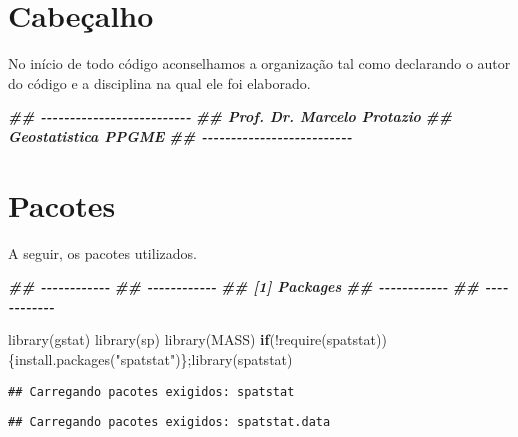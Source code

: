 \documentclass[
]{book}
\newenvironment{Shaded}{\begin{snugshade}}{\end{snugshade}}
\newcommand{\ControlFlowTok}[1]{\textcolor[rgb]{0.13,0.29,0.53}{\textbf{#1}}}
\newcommand{\DocumentationTok}[1]{\textcolor[rgb]{0.56,0.35,0.01}{\textbf{\textit{#1}}}}
\newcommand{\FunctionTok}[1]{\textcolor[rgb]{0.00,0.00,0.00}{#1}}
\newcommand{\NormalTok}[1]{#1}
\newcommand{\SpecialCharTok}[1]{\textcolor[rgb]{0.00,0.00,0.00}{#1}}
\newcommand{\StringTok}[1]{\textcolor[rgb]{0.31,0.60,0.02}{#1}}
\theoremstyle{definition}
\theoremstyle{definition}
\theoremstyle{definition}
\theoremstyle{definition}
\theoremstyle{remark}
\begin{document}
\hypertarget{cabeuxe7alho}{%
\section{Cabeçalho}\label{cabeuxe7alho}}

No início de todo código aconselhamos a organização tal como declarando o autor do código e a disciplina na qual ele foi elaborado.

\begin{Shaded}
\begin{Highlighting}[]
\DocumentationTok{\#\# {-}{-}{-}{-}{-}{-}{-}{-}{-}{-}{-}{-}{-}{-}{-}{-}{-}{-}{-}{-}{-}{-}{-}{-}{-}{-}}
\DocumentationTok{\#\# Prof. Dr. Marcelo Protazio}
\DocumentationTok{\#\# Geostatistica PPGME}
\DocumentationTok{\#\# {-}{-}{-}{-}{-}{-}{-}{-}{-}{-}{-}{-}{-}{-}{-}{-}{-}{-}{-}{-}{-}{-}{-}{-}{-}{-}}
\end{Highlighting}
\end{Shaded}

\hypertarget{pacotes}{%
\section{Pacotes}\label{pacotes}}

A seguir, os pacotes utilizados.

\begin{Shaded}
\begin{Highlighting}[]
\DocumentationTok{\#\# {-}{-}{-}{-}{-}{-}{-}{-}{-}{-}{-}{-}}
\DocumentationTok{\#\# {-}{-}{-}{-}{-}{-}{-}{-}{-}{-}{-}{-}}
\DocumentationTok{\#\# [1] Packages}
\DocumentationTok{\#\# {-}{-}{-}{-}{-}{-}{-}{-}{-}{-}{-}{-}}
\DocumentationTok{\#\# {-}{-}{-}{-}{-}{-}{-}{-}{-}{-}{-}{-}}

\FunctionTok{library}\NormalTok{(gstat)}
\FunctionTok{library}\NormalTok{(sp)}
\FunctionTok{library}\NormalTok{(MASS)}
\ControlFlowTok{if}\NormalTok{(}\SpecialCharTok{!}\FunctionTok{require}\NormalTok{(spatstat))\{}\FunctionTok{install.packages}\NormalTok{(}\StringTok{"spatstat"}\NormalTok{)\};}\FunctionTok{library}\NormalTok{(spatstat)}
\end{Highlighting}
\end{Shaded}

\begin{verbatim}
## Carregando pacotes exigidos: spatstat
\end{verbatim}

\begin{verbatim}
## Carregando pacotes exigidos: spatstat.data
\end{verbatim}
\end{document}
